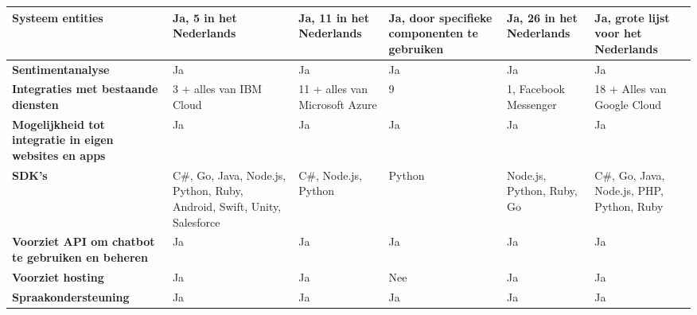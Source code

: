 \begin{center}
\begin{longtable}{| P{2.2cm} | p{2.2cm} |  p{2.2cm} | p{2.2cm} | p{2.2cm} | p{2.2cm} |}
        \textbf{Systeem entities}                                      & Ja, 5 in het Nederlands                                                 & Ja, 11 in het Nederlands       & Ja, door specifieke componenten te gebruiken & Ja, 26 in het Nederlands               & Ja, grote lijst voor het Nederlands           \\  \hline
        \textbf{Sentimentanalyse}                                      & Ja                                                                      & Ja                             & Ja                                           & Ja                                     & Ja                                            \\  \hline
        \textbf{Integraties met bestaande diensten}                    & 3 + alles van IBM Cloud                                                 & 11 + alles van Microsoft Azure & 9                                            & 1, Facebook Messenger                  & 18 + Alles van Google Cloud                   \\  \hline
        \textbf{Mogelijkheid tot integratie in eigen websites en apps} & Ja                                                                      & Ja                             & Ja                                           & Ja                                     & Ja                                            \\  \hline
        \textbf{SDK's}                                                 & C\#, Go, Java, Node.js, Python, Ruby, Android, Swift, Unity, Salesforce & C\#, Node.js, Python           & Python                                       & Node.js, Python, Ruby, Go              & C\#, Go, Java, Node.js, PHP, Python, Ruby     \\  \hline
        \textbf{Voorziet API om chatbot te gebruiken en beheren}       & Ja                                                                      & Ja                             & Ja                                           & Ja                                     & Ja                                            \\  \hline
        \textbf{Voorziet hosting}                                      & Ja                                                                      & Ja                             & Nee                                          & Ja                                     & Ja                                            \\  \hline
        \textbf{Spraakondersteuning}                                   & Ja                                                                      & Ja                             & Ja                                           & Ja                                     & Ja                                            \\  \hline

\end{longtable}
\end{center}

